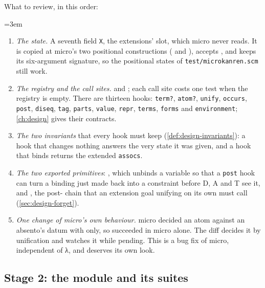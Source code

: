 What to review, in this order:
{\emergencystretch=3em
\begin{enumerate}
  \item \emph{The state.} A seventh field \texttt{X}, the extensions' slot, which micro never reads. It
    is copied at micro's two positional constructions ( and ),
     accepts , and  keeps its six-argument
    signature, so the positional states of \texttt{test/microkanren.scm} still work.
  \item \emph{The registry and the call sites.}  and
    ; each call site costs one  test when the registry is
    empty. There are thirteen hooks: \texttt{term?}, \texttt{atom?}, \texttt{unify}, \texttt{occurs},
    \texttt{post}, \texttt{diseq}, \texttt{tag}, \texttt{parts}, \texttt{value}, \texttt{repr},
    \texttt{terms}, \texttt{forms} and \texttt{environment}; \cref{ch:design} gives their contracts.
  \item \emph{The two invariants} that every hook must keep (\cref{def:design-invariants}): a hook that
    changes nothing answers the very state it was given, and a hook that binds returns the extended
    \texttt{assocs}.
  \item \emph{The two exported primitives}: , which unbinds a variable so that a
    \texttt{post} hook can turn a binding just made back into a constraint before D, A and T see it, and
    , the post- chain that an extension goal unifying on its own must call
    (\cref{sec:design-forget}).
  \item \emph{One change of micro's own behaviour.} micro decided an atom against an absento's datum with
     only, so  succeeded in micro alone. The diff
    decides it by unification and watches it while pending. This is a bug fix of micro, independent of λ,
    and deserves its own look.
\end{enumerate}
}

\subsection{Stage 2: the module and its suites}\label{sec:roadmap-stage2}

